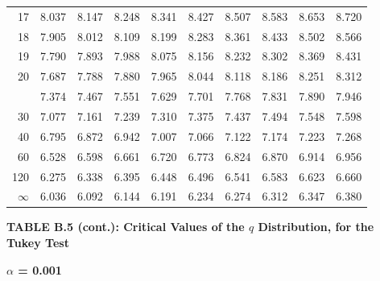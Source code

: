 \documentclass[10pt]{article}
\begin{document}
\begin{longtable}{@{}r!{\vrule width 0.8pt\hspace{0.55em}}rrrrrrrrr@{}}
17 & 8.037 & 8.147 & 8.248 & 8.341 & 8.427 & 8.507 & 8.583 & 8.653 & 8.720 \\
18 & 7.905 & 8.012 & 8.109 & 8.199 & 8.283 & 8.361 & 8.433 & 8.502 & 8.566 \\
19 & 7.790 & 7.893 & 7.988 & 8.075 & 8.156 & 8.232 & 8.302 & 8.369 & 8.431 \\
20 & 7.687 & 7.788 & 7.880 & 7.965 & 8.044 & 8.118 & 8.186 & 8.251 & 8.312 \\
 & 7.374 & 7.467 & 7.551 & 7.629 & 7.701 & 7.768 & 7.831 & 7.890 & 7.946 \\
30 & 7.077 & 7.161 & 7.239 & 7.310 & 7.375 & 7.437 & 7.494 & 7.548 & 7.598 \\
40 & 6.795 & 6.872 & 6.942 & 7.007 & 7.066 & 7.122 & 7.174 & 7.223 & 7.268 \\
60 & 6.528 & 6.598 & 6.661 & 6.720 & 6.773 & 6.824 & 6.870 & 6.914 & 6.956 \\
120 & 6.275 & 6.338 & 6.395 & 6.448 & 6.496 & 6.541 & 6.583 & 6.623 & 6.660 \\
\addlinespace[0.30em]
$\infty$ & 6.036 & 6.092 & 6.144 & 6.191 & 6.234 & 6.274 & 6.312 & 6.347 & 6.380 \\
\end{longtable}
\newpage
\thispagestyle{empty}
\begin{center}
{\large\bfseries TABLE B.5 (cont.): Critical Values of the $q$ Distribution, for the Tukey Test\par}
\end{center}
{\large\bfseries $\alpha$ = 0.001\par}
\vspace{0.45em}
\small
\end{document}
